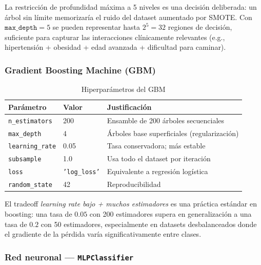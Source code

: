 \documentclass[12pt,a4paper]{article}
\begin{document}
La restricción de profundidad máxima a 5 niveles es una decisión deliberada: un árbol sin límite memorizaría el ruido del dataset aumentado por SMOTE. Con $\texttt{max\_depth}=5$ se pueden representar hasta $2^5 = 32$ regiones de decisión, suficiente para capturar las interacciones clínicamente relevantes (e.g., hipertensión + obesidad + edad avanzada + dificultad para caminar).

\subsubsection{Gradient Boosting Machine (GBM)}

\begin{table}[H]
  \centering
  \caption{Hiperparámetros del GBM}
  \begin{tabular}{lll}
    \toprule
    \textbf{Parámetro} & \textbf{Valor} & \textbf{Justificación}\\
    \midrule
    \texttt{n\_estimators} & 200 & Ensamble de 200 árboles secuenciales\\
    \texttt{max\_depth} & 4 & Árboles base superficiales (regularización)\\
    \texttt{learning\_rate} & 0.05 & Tasa conservadora; más estable\\
    \texttt{subsample} & 1.0 & Usa todo el dataset por iteración\\
    \texttt{loss} & \texttt{'log\_loss'} & Equivalente a regresión logística\\
    \texttt{random\_state} & 42 & Reproducibilidad\\
    \bottomrule
  \end{tabular}
\end{table}

El tradeoff \textit{learning rate bajo + muchos estimadores} es una práctica estándar en boosting: una tasa de $0.05$ con 200 estimadores supera en generalización a una tasa de $0.2$ con 50 estimadores, especialmente en datasets desbalanceados donde el gradiente de la pérdida varía significativamente entre clases.

\subsubsection{Red neuronal — \texttt{MLPClassifier}}
\end{document}
